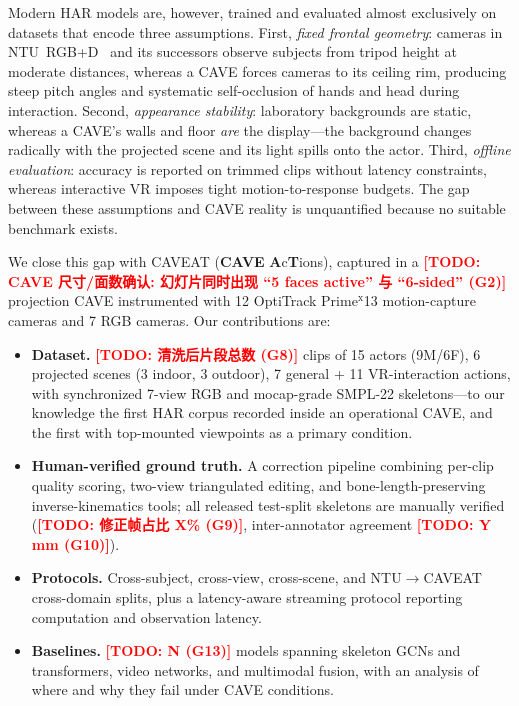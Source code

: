 \documentclass[10pt,twocolumn,letterpaper]{article}
\newcommand{\todocjkfont}{}
\newif\iftodos \todostrue   %
\newcommand{\todo}[1]{\iftodos\textcolor{red}{\textbf{[TODO: {\todocjkfont #1}]}}\fi}
\newcommand{\DATASET}{CAVEAT}
\newcommand{\numclips}{\todo{清洗后片段总数 (G8)}}
\begin{document}
Modern HAR models are, however, trained and evaluated almost exclusively on
datasets that encode three assumptions. First, \emph{fixed frontal
geometry}: cameras in NTU~RGB+D~\cite{shahroudy2016ntu,liu2020ntu120} and
its successors observe subjects from tripod height at moderate distances,
whereas a CAVE forces cameras to its ceiling rim, producing steep pitch
angles and systematic self-occlusion of hands and head during interaction.
Second, \emph{appearance stability}: laboratory backgrounds are static,
whereas a CAVE's walls and floor \emph{are} the display---the background
changes radically with the projected scene and its light spills onto the
actor. Third, \emph{offline evaluation}: accuracy is reported on trimmed
clips without latency constraints, whereas interactive VR imposes tight
motion-to-response budgets. The gap between these assumptions and CAVE
reality is unquantified because no suitable benchmark exists.

We close this gap with \DATASET{} (\textbf{CAVE}
\textbf{A}c\textbf{T}ions), captured in a
\todo{CAVE 尺寸/面数确认: 幻灯片同时出现 ``5 faces active'' 与 ``6-sided''
(G2)} projection CAVE instrumented with 12 OptiTrack Prime$^{\mathrm{x}}$13
motion-capture cameras and 7 RGB cameras. Our contributions are:
\begin{itemize}
  \item \textbf{Dataset.} \numclips{} clips of 15 actors (9M/6F), 6
        projected scenes (3 indoor, 3 outdoor), 7 general + 11
        VR-interaction actions, with synchronized 7-view RGB and
        mocap-grade SMPL-22 skeletons---to our knowledge the first HAR
        corpus recorded inside an operational CAVE, and the first with
        top-mounted viewpoints as a primary condition.
  \item \textbf{Human-verified ground truth.} A correction pipeline
        combining per-clip quality scoring, two-view triangulated editing,
        and bone-length-preserving inverse-kinematics tools; all released
        test-split skeletons are manually verified
        (\todo{修正帧占比 X\% (G9)}, inter-annotator agreement
        \todo{Y mm (G10)}).
  \item \textbf{Protocols.} Cross-subject, cross-view, cross-scene, and
        NTU$\rightarrow$\DATASET{} cross-domain splits, plus a
        latency-aware streaming protocol reporting computation and
        observation latency.
  \item \textbf{Baselines.} \todo{N (G13)} models spanning skeleton GCNs
        and transformers, video networks, and multimodal fusion, with an
        analysis of where and why they fail under CAVE conditions.
\end{itemize}
\end{document}
